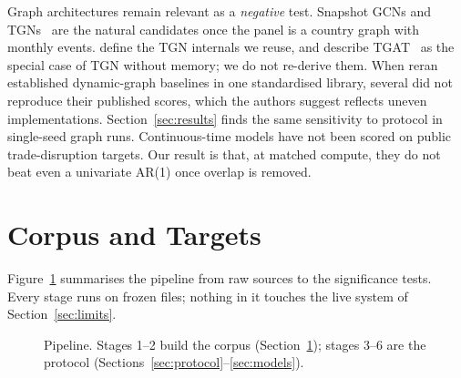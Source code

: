 \documentclass[10pt]{article}
\begin{document}
Graph architectures remain relevant as a \emph{negative} test. Snapshot GCNs and TGNs~\citep{ref10,ref13} are the natural candidates once the panel is a country graph with monthly events. \citet{ref10} define the TGN internals we reuse, and describe TGAT~\citep{ref13} as the special case of TGN without memory; we do not re-derive them. When \citet{ref11} reran established dynamic-graph baselines in one standardised library, several did not reproduce their published scores, which the authors suggest reflects uneven implementations. Section~\ref{sec:results} finds the same sensitivity to protocol in single-seed graph runs. Continuous-time models have not been scored on public trade-disruption targets. Our result is that, at matched compute, they do not beat even a univariate AR(1) once overlap is removed.

\section{Corpus and Targets}
\label{sec:corpus}

Figure~\ref{fig:pipeline} summarises the pipeline from raw sources to the significance tests. Every stage runs on frozen files; nothing in it touches the live system of Section~\ref{sec:limits}.

\begin{figure}[t]
\centering
{}
\caption{Pipeline. Stages 1--2 build the corpus (Section~\ref{sec:corpus}); stages 3--6 are the protocol (Sections~\ref{sec:protocol}--\ref{sec:models}).}
\label{fig:pipeline}
\end{figure}
\end{document}
